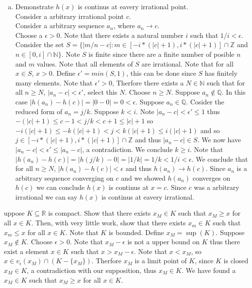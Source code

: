 \documentclass[12pt]{article}
\makeatletter
\theoremstyle{homework}
\newenvironment{exercise}[1]
{\def\@currentlabel{#1}\exercisecore}
{\endexercisecore}
\makeatother
\begin{document}
\begin{enumerate}[(a)]
\item
Demonstrate $h(x)$ is continus at eavery irrational point.\\
Consider a arbitrary irrational point $c$.\\
Consider a arbitrary sequence $a_n$, where $a_n\rightarrow c$.\\
Choose a $\epsilon>0$.  Note that there exists a natural number $i$ such that $1/i<\epsilon$.  Consider the set $S=\{|m/n-c|:m\in [-i*(|c|+1),i*(|c|+1)]\cap \mathbb{Z}$ and $n\in [0,i]\cap \mathbb{N}\}$.  Note $S$ is finite since there are a finite number of posible $n$ and $m$ values.  Note that all elements of $S$ are irrational.  Note that  for all $x\in S$, $x>0$.  Define $\epsilon'=min(S,1)$, this can be done since $S$ has finitely many elements.  Note that $\epsilon'>0$, Therfore there exists a $N\in\mathbb{N}$ such that for all $n\geq N$, $|a_n-c|<\epsilon'$, select this $N$.  Choose $n\geq N$.  Suppose $a_n\not\in\mathbb{Q}$.  In this case $|h(a_n)-h(c)|=|0-0|=0<\epsilon$.  Suppose $a_n\in\mathbb{Q}$.  Cosider the reduced form of $a_n=j/k$.  Suppose $k<i$.  Note $|a_n-c|<\epsilon'\leq 1$ thus $-(|c|+1)\leq c-1<j/k<c+1\leq |c|+1$ so $-i(|c|+1)\leq -k(|c|+1)<j<k(|c|+1)\leq i(|c|+1)$ and so $j\in [-i*(|c|+1),i*(|c|+1)]\cap \mathbb{Z}$ and thus $|a_n-c|\in S$.  We now have $|a_n-c|<\epsilon'\leq |a_n-c|$, a contradiction.  We conclude $k\geq i$.  Note that $|h(a_n)-h(c)|=|h(j/k)-0|=|1/k|=1/k<1/i<\epsilon$.  We conclude that for all $n\geq N$, $|h(a_n)-h(c)|<\epsilon$ and thus $h(a_n)\rightarrow h(c)$.  Since $a_n$ is a arbitrary sequence converging on $c$ and we showed $h(a_n)$ converges on $h(c)$ we can conclude $h(x)$ is continus at $x=c$.  Since $c$ was a arbitrary irrational we can say $h(x)$ is continus at eavery irrational.
\end{enumerate}
\begin{exercise}

Suppose $K \subseteq \mathbb{R}$ is compact. Show that there exists $x_M \in K$ such that $x_M \geq x$ for all $x \in K$.
Then, with very little work, show that there exists $x_m \in K$ such that $x_m \leq x$ for all $x \in K$.
\end{exercise}
Note that $K$ is bounded.  Define $x_M=\sup(K)$.  Suppose $x_M\not\in K$.  Choose $\epsilon>0$.  Note that $x_M-\epsilon$ is not a upper bound on $K$ thus there exist a element $x\in K$ such that $x>x_M-\epsilon$.  Note that $x<x_M$, so $x\in v_\epsilon(x_M)\cap (K-\{x_M\})$.  Therfore $x_M$ is a limit point of $K$, since $K$ is closed $x_M\in K$, a contradiction with our supposition, thus $x_M\in K$.  We have found a $x_M\in K$ such that $x_M \geq x$ for all $x \in K$.\\
\end{document}

